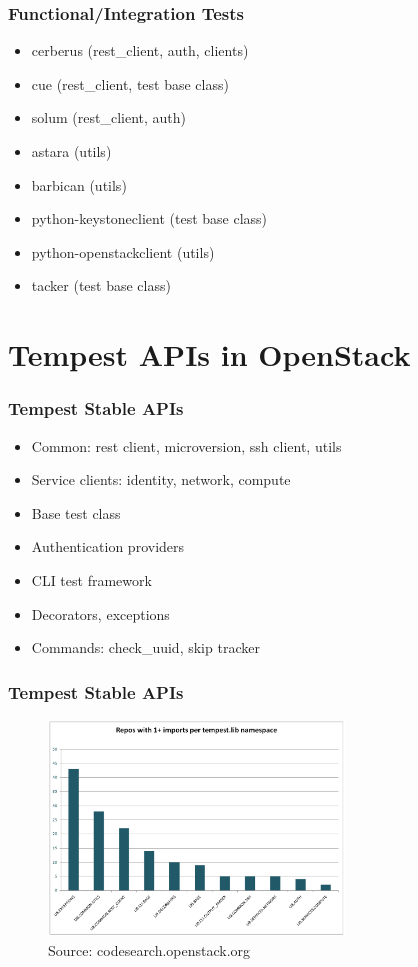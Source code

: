 \documentclass[aspectratio=169,11pt,hyperref={colorlinks=true}]{beamer}
\begin{document}
\begin{frame}
    \frametitle{Functional/Integration Tests}
    \begin{itemize}
        \item{cerberus (rest\_client, auth, clients)}
        \item{cue (rest\_client, test base class)}
        \item{solum (rest\_client, auth)}
    \end{itemize}
    \begin{itemize}
        \item{astara (utils)}
        \item{barbican (utils)}
        \item{python-keystoneclient (test base class)}
        \item{python-openstackclient (utils)}
        \item{tacker (test base class)}
    \end{itemize}
\end{frame}

\section{Tempest APIs in OpenStack}

\begin{frame}
    \frametitle{Tempest Stable APIs}
    \begin{itemize}
        \item{Common: rest client, microversion, ssh client, utils}
        \item{Service clients: identity, network, compute}
        \item{Base test class}
        \item{Authentication providers}
        \item{CLI test framework}
        \item{Decorators, exceptions}
        \item{Commands: check\_uuid, skip tracker}
    \end{itemize}
\end{frame}

\begin{frame}
    \frametitle{Tempest Stable APIs}
    \begin{figure}[p]
    	\centering
    	\includegraphics[width=0.7\textwidth]{lib-imports.png}
    	\caption{Source: codesearch.openstack.org}
    \end{figure}
\end{frame}
\end{document}
